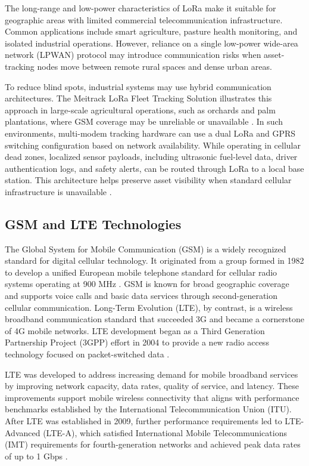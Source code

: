 The long-range and low-power characteristics of LoRa make it suitable for geographic areas with limited commercial telecommunication infrastructure. Common applications include smart agriculture, pasture health monitoring, and isolated industrial operations. However, reliance on a single low-power wide-area network (LPWAN) protocol may introduce communication risks when asset-tracking nodes move between remote rural spaces and dense urban areas.

To reduce blind spots, industrial systems may use hybrid communication architectures. The Meitrack LoRa Fleet Tracking Solution illustrates this approach in large-scale agricultural operations, such as orchards and palm plantations, where GSM coverage may be unreliable or unavailable \cite{meitrack_lora_fleet}. In such environments, multi-modem tracking hardware can use a dual LoRa and GPRS switching configuration based on network availability. While operating in cellular dead zones, localized sensor payloads, including ultrasonic fuel-level data, driver authentication logs, and safety alerts, can be routed through LoRa to a local base station. This architecture helps preserve asset visibility when standard cellular infrastructure is unavailable \cite{meitrack_lora_fleet}.

\subsection{GSM and LTE Technologies}

The Global System for Mobile Communication (GSM) is a widely recognized standard for digital cellular technology. It originated from a group formed in 1982 to develop a unified European mobile telephone standard for cellular radio systems operating at 900 MHz \cite{iec_gsm_tutorial}. GSM is known for broad geographic coverage and supports voice calls and basic data services through second-generation cellular communication. Long-Term Evolution (LTE), by contrast, is a wireless broadband communication standard that succeeded 3G and became a cornerstone of 4G mobile networks. LTE development began as a Third Generation Partnership Project (3GPP) effort in 2004 to provide a new radio access technology focused on packet-switched data \cite{miyim2019lte_performance}.

LTE was developed to address increasing demand for mobile broadband services by improving network capacity, data rates, quality of service, and latency. These improvements support mobile wireless connectivity that aligns with performance benchmarks established by the International Telecommunication Union (ITU). After LTE was established in 2009, further performance requirements led to LTE-Advanced (LTE-A), which satisfied International Mobile Telecommunications (IMT) requirements for fourth-generation networks and achieved peak data rates of up to 1 Gbps \cite{miyim2019lte_performance,kanchi2013ltea}.

